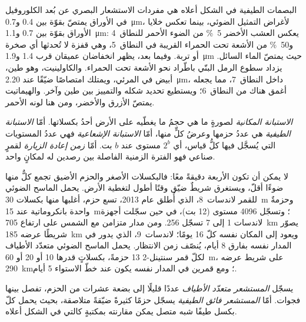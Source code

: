 البصمات الطيفية في الشكل أعلاه هي مفردات الاستشعار البصري عن بُعد
الكلوروفيل في الأوراق يمتصّ بقوّة بين 0.4
و\qty{0.7}{\micro\metre}، لأغراض التمثيل الضوئي، بينما تعكس خلايا الأوراق
بقوّة بين 0.7 و\qty{1.1}{\micro\metre}: يعكس العشب الأخضر
\qty{5}{\percent} من الضوء الأحمر للنطاق~4 و\qty{50}{\percent}
من الأشعة تحت الحمراء القريبة في النطاق~5، وهي قفزة لا تُحدثها أي صخرة أو تربة. وفيما بعد، يظهر
انخفاضان عميقان قرب 1.4 و\qty{1.9}{\micro\metre} حيث يمتصّ الماء السائل.
يزداد سطوع الرمل البنّي باطّراد نحو الأشعة تحت الحمراء. والكاولينيت،
وهو طين، أبيض في المرئي، ويمتلك امتصاصًا ضيّقًا عند
\qty{2.20}{\micro\metre}، داخل النطاق~7، مما يجعله أغمق هناك من
النطاق~6؛ ويستطيع  تحديد شكله والتمييز بين طين
وآخر. والهيماتيت يمتصّ الأزرق والأخضر، ومن هنا لونه الأحمر.

\begin{definition}\label{def:b3:remote-sensing-gis:resolutions}
\emph{الاستبانة المكانية} لصورةٍ ما هي حجمُ
ما يغطّيه على الأرض أحدُ بكسلاتها. أمّا \emph{الاستبانة
الطيفية} هي عددُ حزمها وعرضُ كلٍّ منها،
أمّا \emph{الاستبانة الإشعاعية} فهي
عددُ المستويات التي يُسجَّل فيها كلُّ قياس، أي $2^b$ مستوى عند $b$ بت.
أمّا \emph{زمن إعادة الزيارة} لقمرٍ صناعي فهو الفترة
الزمنية الفاصلة بين رصدين له لمكانٍ واحد.
\end{definition}

لا يمكن أن تكون الأربعة دقيقةً معًا: فالبكسلات الأصغر والحزم الأضيق
تجمع كلٌّ منها ضوءًا أقلّ، ويستغرق شريطٌ ضيّق وقتًا أطول لتغطية
الأرض. يحمل الماسح الضوئي للقمر لاندسات~8، الذي أُطلق عام 2013، تسع حزم، أغلبها
منها بكسلات \qty{30}{m} وحزمةٌ واحدة بانكروماتية عند \qty{15}{m}؛ وتسجّل
4096 مستوى (12 بت)، في حين سجّلت أجهزة لاندسات 1 إلى 7
تسجّل 256. ومن مدار متزامن مع الشمس على ارتفاع \qty{705}{km} يصوّر
شريطًا عرضه \qty{185}{km} ويعود إلى المكان نفسه كلّ 16 يومًا؛
لاندسات~9، الذي يدور في المدار نفسه بفارق 8 أيام، يُنصّف زمن الانتظار.
يحمل الماسح الضوئي متعدّد الأطياف لكلّ قمر سنتينل-2 13 حزمةً، بكسلاتٍ قدرها 10 أو 20
أو \qty{60}{m}، على شريط عرضه \qty{290}{km}؛ ومع قمرين في المدار نفسه يكون
 عند خطّ الاستواء 5 أيام.

\begin{definition}\label{def:b3:remote-sensing-gis:sensors}
يسجّل \emph{المستشعر متعدّد الأطياف} عددًا قليلًا
إلى بضعة عشرات من الحزم، تفصل بينها فجوات. أمّا \emph{المستشعر فائق
الطيفية} يسجّل حزمًا كثيرةً ضيّقةً متلاصقة،
بحيث يحمل كلّ بكسل طيفًا شبه متصل يمكن مقارنته
بمكتبةٍ كالتي في الشكل أعلاه.
\end{definition}

